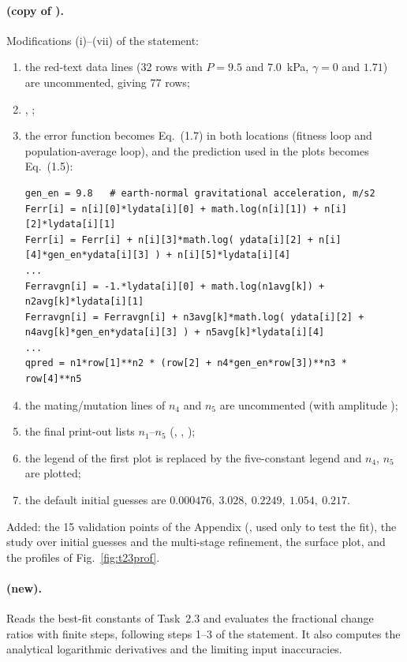 \paragraph{ (copy of ).} Modifications (i)--(vii) of the statement:
\begin{enumerate}[label=(\roman*)]
  \item the red-text data lines (32 rows with $P=9.5$ and $7.0$~kPa, $\gamma=0$ and $1.71$) are
        uncommented, giving 77 rows;
  \item {}, ;
  \item the error function becomes Eq.~(1.7) in both locations (fitness loop and population-average loop),
        and the prediction used in the plots becomes Eq.~(1.5):
\begin{lstlisting}
gen_en = 9.8   # earth-normal gravitational acceleration, m/s2
Ferr[i] = n[i][0]*lydata[i][0] + math.log(n[i][1]) + n[i][2]*lydata[i][1]
Ferr[i] = Ferr[i] + n[i][3]*math.log( ydata[i][2] + n[i][4]*gen_en*ydata[i][3] ) + n[i][5]*lydata[i][4]
...
Ferravgn[i] = -1.*lydata[i][0] + math.log(n1avg[k]) + n2avg[k]*lydata[i][1]
Ferravgn[i] = Ferravgn[i] + n3avg[k]*math.log( ydata[i][2] + n4avg[k]*gen_en*ydata[i][3] ) + n5avg[k]*lydata[i][4]
...
qpred = n1*row[1]**n2 * (row[2] + n4*gen_en*row[3])**n3 * row[4]**n5
\end{lstlisting}
  \item the mating/mutation lines of $n_4$ and $n_5$ are uncommented (with amplitude );
  \item the final print-out lists $n_1$--$n_5$ (, , );
  \item the legend of the first plot is replaced by the five-constant legend and $n_4$, $n_5$ are plotted;
  \item the default initial guesses are $0.000476,\ 3.028,\ 0.2249,\ 1.054,\ 0.217$.
\end{enumerate}
Added: the 15 validation points of the Appendix (, used only to test the fit), the study
over initial guesses and the multi-stage refinement, the surface plot, and the profiles of
Fig.~\ref{fig:t23prof}.

\paragraph{ (new).} Reads the best-fit constants of Task~2.3 and evaluates the fractional
change ratios with finite steps, following steps 1--3 of the statement. It also computes the analytical
logarithmic derivatives and the limiting input inaccuracies.

